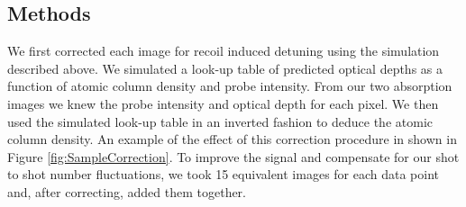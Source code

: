 \documentclass[12pt]{iopart}
\begin{document}
\subsection{Methods}
\par We first corrected each image for recoil induced detuning using the simulation described above. We simulated a look-up table of predicted optical depths as a function of atomic column density and probe intensity. From our two absorption images we knew the probe intensity and optical depth for each pixel. We then used the simulated look-up table in an inverted fashion to deduce the atomic column density. An example of the effect of this correction procedure in shown in Figure \ref{fig:SampleCorrection}.  To improve the signal and compensate for our shot to shot number fluctuations, we took 15 equivalent images for each data point and, after correcting, added them together.
\end{document}
